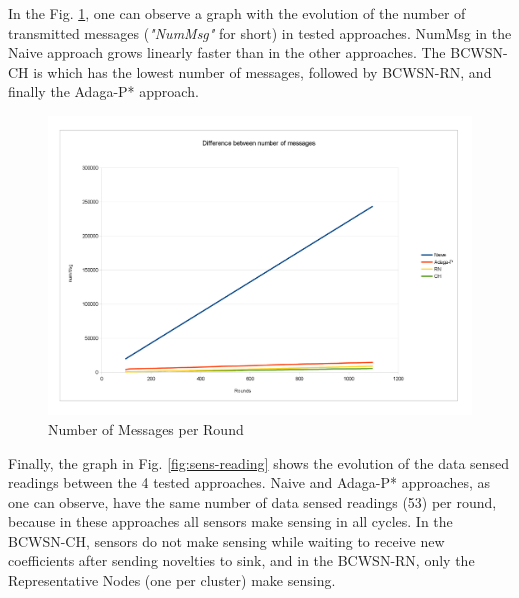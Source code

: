 \documentclass[conference]{IEEEtran}
\begin{document}
In the Fig. \ref{fig:num-msg}, one can observe a graph with the evolution of the
number of transmitted messages ({\it "NumMsg"} for short) in tested approaches.
NumMsg in the Naive approach grows linearly faster than in the other approaches.
The BCWSN-CH is which has the lowest number of messages, followed by BCWSN-RN,
and finally the Adaga-P* approach.

\begin{figure}[!htb]
\centering
	\includegraphics[scale=0.085]{graf_numMsg_.png}
    \caption{Number of Messages per Round}
    \label{fig:num-msg}
\end{figure}


Finally, the graph in Fig. \ref{fig:sens-reading} shows the evolution of
the data sensed readings between the 4 tested approaches.
Naive and Adaga-P* approaches, as one can observe, have the same number of data
sensed readings (53) per round, because in these approaches all sensors
make sensing in all cycles. In the BCWSN-CH, sensors do not make sensing while
waiting to receive new coefficients after sending novelties to sink, and in the
BCWSN-RN, only the Representative Nodes (one per cluster) make sensing.
\end{document}
